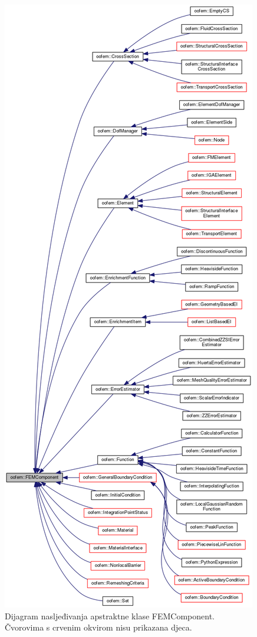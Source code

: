 \documentclass[a4paper,twoside,12pt]{memoir} %
\begin{document}
\begin{figure}[h!t]
\begin{center}
\includegraphics[scale=0.26]{pictures/chapter_oofem/FEMComponent_inheritance.png}
\caption{Dijagram nasljeđivanja apstraktne klase FEMComponent. Čvorovima s crvenim okvirom nisu prikazana djeca. \cite{oofem_reference}}
\label{fig:FEMComponent_inheritance}
\end{center}
\end{figure}
\end{document}
